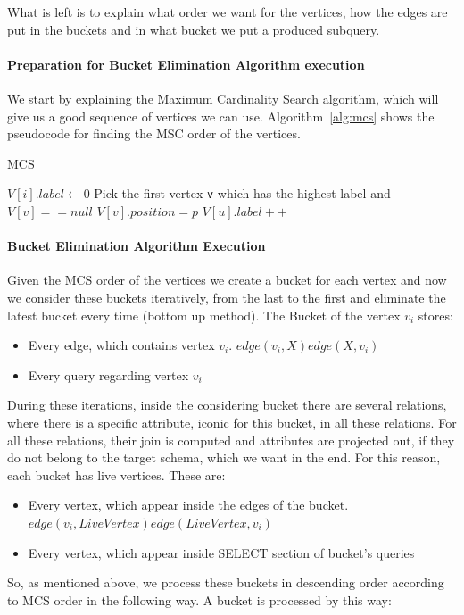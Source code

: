 What is left is to explain what order we want for the vertices, how the edges are put in the buckets and in what bucket we put a produced subquery. 

\paragraph{Preparation for Bucket Elimination Algorithm execution}
We start by explaining the Maximum Cardinality Search algorithm, which will give us a good sequence of vertices we can use. Algorithm~\ref{alg:mcs} shows the pseudocode for finding the MSC order of the vertices.

\begin{algorithm}
\caption{MCS}\label{alg:mcs}
\begin{algorithmic}[1]
	\State $V[i].label \gets 0$
    \EndFor
	\State Pick the first vertex \texttt{v} which has the highest label and $V[v] == null$
            \State $V[v].position = p$
                		\State $V[u].label++$
		\EndIf
            \EndFor
    \EndFor
\EndProcedure
\end{algorithmic}
\end{algorithm}

\paragraph{Bucket Elimination Algorithm Execution}
Given the MCS order of the vertices we create a bucket for each vertex and now we consider these buckets iteratively, from the last to the first and eliminate the latest bucket every time (bottom up method). The Bucket of the vertex $v_i$ stores:
\begin{itemize}
\item Every edge, which contains vertex $v_i$. $edge(v_i,X) edge(X,v_i)$
\item Every query regarding vertex $v_i$
\end{itemize}
\noindent During these iterations, inside the considering bucket there are several relations, where there is a specific attribute, iconic for this bucket, in all these relations. For all these relations, their join is computed and attributes are projected out, if they do not belong to the target schema, which we want in the end. For this reason, each bucket has live vertices. These are:
\begin{itemize}
\item Every vertex, which appear inside the edges of the bucket. $edge(v_i,LiveVertex) edge(LiveVertex,v_i )$
\item Every vertex, which appear inside SELECT section of bucket’s queries
\end{itemize}
So, as mentioned above, we process these buckets in descending order according to MCS order in the following way. A bucket is processed by this way:

